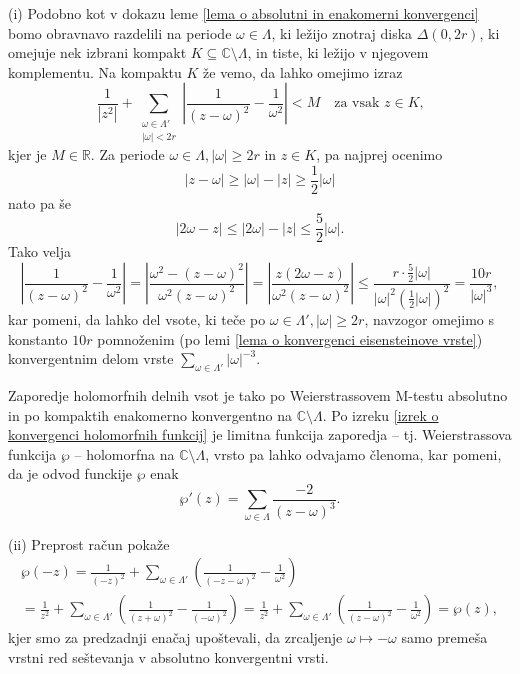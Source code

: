 \documentclass[mat1]{fmfdelo}
\numberwithin{equation}{section}
\newcommand{\R}{\mathbb R}
\newcommand{\N}{\mathbb N}
\newcommand{\C}{\mathbb C}
\newcommand{\om}{\omega}
\newcommand{\abs}[1]{\left\lvert #1 \right\rvert}
\newcommand{\disk}[2]{\Delta(#1, #2)}
\theoremstyle{definition}
\begin{document}
\begin{dokaz}
    (i) Podobno kot v dokazu leme \ref{lema o absolutni in enakomerni konvergenci} bomo obravnavo razdelili na periode $\om\in \Lambda$, ki ležijo znotraj diska $\disk{0}{2r}$, ki omejuje nek izbrani kompakt $K \subseteq \C\setminus\Lambda$, in tiste, ki ležijo v njegovem komplementu. 
    Na kompaktu $K$ že vemo, da lahko omejimo izraz
    \[
        \frac{1}{\abs{z^2}} + \sum_{\substack{\om\in\Lambda' \\ \abs{\om} < 2r}} \left\lvert\frac{1}{(z - \om)^2} - \frac{1}{\om^2}\right\rvert < M \quad \text{za vsak $z \in K$,}
    \]
    kjer je $M \in \R$.
    Za periode $\om\in\Lambda, \abs{\om} \geq 2r$ in $z \in K$, pa najprej ocenimo 
    \[
        \abs{z - \om} \geq \abs{\om} - \abs{z} \geq \frac{1}{2}\abs{\om}  
    \] 
    nato pa še
    \[
        \abs{2\om - z} \leq \abs{2\om} - \abs{z} \leq \frac{5}{2} \abs{\om}.
    \]
    Tako velja
    \[
        \abs{\frac{1}{(z - \om)^2} - \frac{1}{\om^2}} = 
        \abs{\frac{\om^2 - (z - \om)^2}{\om^2(z - \om)^2}} =
        \abs{\frac{z(2\om - z)}{\om^2 (z - \om)^2}} \leq
        \frac{r \cdot \frac{5}{2}\abs{\om}}{\abs{\om}^2(\frac{1}{2}\abs{\om})^2} = 
        \frac{10r}{\abs{\om}^3},
    \]
    kar pomeni, da lahko del vsote, ki teče po $\om\in\Lambda', \abs{\om} \geq 2r$, navzogor omejimo s konstanto $10r$ pomnoženim (po lemi \ref{lema o konvergenci eisensteinove vrste}) konvergentnim delom vrste $\sum_{\om\in\Lambda'}\abs{\om}^{-3}$.

    Zaporedje holomorfnih delnih vsot je tako po Weierstrassovem M-testu absolutno in po kompaktih enakomerno konvergentno na $\C\setminus\Lambda$. Po izreku \ref{izrek o konvergenci holomorfnih funkcij} je limitna funkcija zaporedja -- tj. Weierstrassova funkcija $\wp$ -- holomorfna na $\C\setminus\Lambda$, vrsto pa lahko odvajamo členoma, kar pomeni, da je odvod funckije $\wp$ enak
    \[
        \wp'(z) = \sum_{\om \in \Lambda}\frac{-2}{(z-\om)^3}. 
    \]

    (ii) Preprost račun pokaže
    \begin{multline*}
        \wp(-z) =   
        \frac{1}{(-z)^2} + \sum_{\om\in\Lambda'}\left(\frac{1}{(-z-\om)^2} - \frac{1}{\om^2}\right) \\ = 
        \frac{1}{z^2} + \sum_{\om\in\Lambda'}\left(\frac{1}{(z+\om)^2} - \frac{1}{(-\om)^2}\right) =
        \frac{1}{z^2} + \sum_{\om\in\Lambda'}\left(\frac{1}{(z-\om)^2} - \frac{1}{\om^2}\right) =
        \wp(z),
    \end{multline*}
    kjer smo za predzadnji enačaj upoštevali, da zrcaljenje $\omega \mapsto -\omega$ samo premeša vrstni red seštevanja v absolutno konvergentni vrsti.


\end{dokaz}
\end{document}
